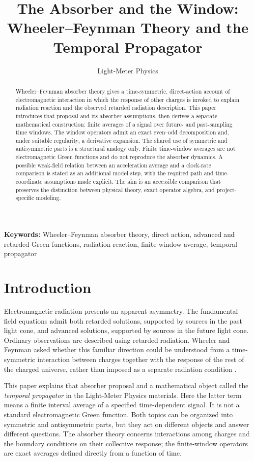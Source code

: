 \documentclass[12pt]{article}
\title{The Absorber and the Window:\\
Wheeler--Feynman Theory and the Temporal Propagator}
\author{Light-Meter Physics}
\date{}
\begin{document}
\maketitle

\begin{abstract}
Wheeler--Feynman absorber theory gives a time-symmetric, direct-action account of electromagnetic interaction in which the response of other charges is invoked to explain radiation reaction and the observed retarded radiation description. This paper introduces that proposal and its absorber assumptions, then derives a separate mathematical construction: finite averages of a signal over future- and past-sampling time windows. The window operators admit an exact even--odd decomposition and, under suitable regularity, a derivative expansion. The shared use of symmetric and antisymmetric parts is a structural analogy only. Finite time-window averages are not electromagnetic Green functions and do not reproduce the absorber dynamics. A possible weak-field relation between an acceleration average and a clock-rate comparison is stated as an additional model step, with the required path and time-coordinate assumptions made explicit. The aim is an accessible comparison that preserves the distinction between physical theory, exact operator algebra, and project-specific modeling.
\end{abstract}

\noindent\textbf{Keywords:} Wheeler--Feynman absorber theory, direct action, advanced and retarded Green functions, radiation reaction, finite-window average, temporal propagator

\section{Introduction}

Electromagnetic radiation presents an apparent asymmetry. The fundamental field equations admit both retarded solutions, supported by sources in the past light cone, and advanced solutions, supported by sources in the future light cone. Ordinary observations are described using retarded radiation. Wheeler and Feynman asked whether this familiar direction could be understood from a time-symmetric interaction between charges together with the response of the rest of the charged universe, rather than imposed as a separate radiation condition \cite{WheelerFeynman1945,WheelerFeynman1949}.

This paper explains that absorber proposal and a mathematical object called the \emph{temporal propagator} in the Light-Meter Physics materials. Here the latter term means a finite interval average of a specified time-dependent signal. It is not a standard electromagnetic Green function. Both topics can be organized into symmetric and antisymmetric parts, but they act on different objects and answer different questions. The absorber theory concerns interactions among charges and the boundary conditions on their collective response; the finite-window operators are exact averages defined directly from a function of time.
\end{document}
